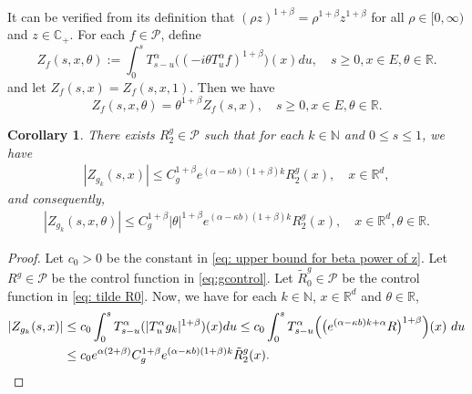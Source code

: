 \documentclass[12pt, a4paper]{amsart}
\newtheorem{cor}[thm]{Corollary}
\theoremstyle{definition}
\numberwithin{equation}{section}
\begin{document}
    It can be verified from its definition that $(\rho z)^{1+\beta} = \rho^{1+\beta}z^{1+\beta}$ for all $\rho \in [0,\infty)$ and $z\in \mathbb C_+$.
For each $f\in \mathcal{P}$, define
\[
    Z_f(s,x,\theta)
    :=\int_0^s T^{\alpha}_{s-u}\big((-i\theta T_u^{\alpha}f)^{1+\beta}\big)(x)du ,
    \quad s\geq 0, x\in E, \theta \in \mathbb R.
\]
and let $Z_f(s,x)=Z_f(s,x,1)$.
Then we have
\begin{equation}\label{zfunction}
    Z_f(s,x,\theta)=\theta^{1+\beta}Z_f(s,x),
    \quad s\geq 0, x\in E, \theta \in \mathbb R.
\end{equation}

\begin{cor}
\label{cor: corollary2}
    There exists $R^g_2\in \mathcal P$ such that for each $k\in\mathbb N$ and $0\leq s\leq1$, we have
\begin{align}
\label{zineq2}
    |Z_{g_k}(s,x)|\leq C_g^{1+\beta}e^{(\alpha-\kappa b)(1+\beta)k}R^g_2(x), \quad x\in \mathbb{R}^d,
\end{align}
    and consequently,
\begin{align}
    |Z_{g_k}(s,x,\theta)|\leq C_g^{1+\beta}|\theta|^{1+\beta}e^{(\alpha-\kappa b)(1+\beta)k}R^g_2(x), \quad x\in \mathbb{R}^d,\theta\in \mathbb{R}. \label{zineq1}
\end{align}
\end{cor}

\begin{proof}
    Let $c_0 > 0$ be the constant in \eqref{eq: upper bound for beta power of z}.
    Let $R^g\in \mathcal P$ be the control function in \eqref{eq:gcontrol}.
    Let $\tilde R^g_0 \in \mathcal P$ be the control function in \eqref{eq: tilde R0}.
    Now, we have for each $k\in\mathbb N$, $x\in \mathbb{R}^d$ and $\theta\in \mathbb{R}$,
\begin{align}
    |Z_{g_k}(s,x)|
    &\leq c_0\int_0^s T_{s-u}^{\alpha}(|T_u^{\alpha}g_k|^{1+\beta})(x)du
    \leq c_0 \int_0^s T_{s-u}^{\alpha}\Big(\big(e^{(\alpha-\kappa b)k+\alpha}R\big)^{1+\beta}\Big)(x)~du
    \\&\leq c_0e^{\alpha(2+\beta)} C_g^{1+\beta}e^{(\alpha-\kappa b)(1+\beta)k}\tilde R^g_2(x).
\qedhere
\end{align}
\end{proof}
\end{document}
